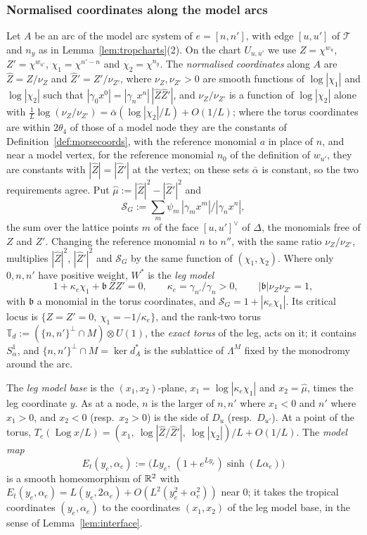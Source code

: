 \subsubsection*{Normalised coordinates along the model arcs}
Let $A$ be an arc of the model arc system of $e=[n,n']$, with edge $[u,u']$ of $\mathcal T$ and $n_y$ as in
Lemma~\ref{lem:tropcharts}(2). On the chart $U_{u,u'}$ we use $Z=\chi^{w_u}$, $Z'=\chi^{w_{u'}}$, $\chi_1=\chi^{n'-n}$ and
$\chi_2=\chi^{n_y}$. The \emph{normalised coordinates} along $A$ are $\hat Z=Z/\nu_Z$ and $\hat Z'=Z'/\nu_{Z'}$, where
$\nu_Z,\nu_{Z'}>0$ are smooth functions of $\log|\chi_1|$ and $\log|\chi_2|$ such that $|\gamma_0x^0|=|\gamma_nx^n|\,|\hat
Z\hat Z'|$, and $\nu_Z/\nu_{Z'}$ is a function of $\log|\chi_2|$ alone with $\frac1L\log(\nu_Z/\nu_{Z'})=\bar\alpha(\log
|\chi_2|/L)+O(1/L)$; where the torus coordinates are within $2\theta_4$ of those of a model node they are the constants of
Definition~\ref{def:morsecoords}, with the reference monomial $a$ in place of $n$, and near a model vertex, for the
reference monomial $n_0$ of the definition of $w_{u'}$, they are constants with $|\hat Z|=|\hat Z'|$ at the vertex; on these sets $\bar\alpha$ is constant, so the two requirements agree.
Put $\hat\mu:=|\hat Z|^2-|\hat Z'|^2$ and
\[
\mathcal S_G:=\sum_m\psi_m\,|\gamma_mx^m|/|\gamma_nx^n|,
\]
the sum over the lattice points $m$ of the face $[u,u']^\vee$ of $\Delta$, the monomials free of $Z$ and $Z'$. Changing
the reference monomial $n$ to $n''$, with the same ratio $\nu_Z/\nu_{Z'}$, multiplies $|\hat Z|^2$, $|\hat Z'|^2$ and
$\mathcal S_G$ by the same function of $(\chi_1,\chi_2)$. Where only $0,n,n'$ have positive weight, $W^*$ is the \emph{leg
model}
\begin{equation}\label{eq:legmodel}
1+\kappa_e\chi_1+\mathfrak b\,ZZ'=0,\qquad\kappa_e=\gamma_{n'}/\gamma_n>0,\qquad|\mathfrak b|\nu_Z\nu_{Z'}=1,
\end{equation}
with $\mathfrak b$ a monomial in the torus coordinates, and $\mathcal S_G=1+|\kappa_e\chi_1|$. Its critical locus is
$\{Z=Z'=0,\ \chi_1=-1/\kappa_e\}$, and the rank-two torus $\mathbb T_d:=(\{n,n'\}^\perp\cap M)\otimes U(1)$, the
\emph{exact torus} of the leg, acts on it; it contains $S^1_\alpha$, and $\{n,n'\}^\perp\cap M=\ker d^*_A$ is the sublattice
of $\Lambda^M$ fixed by the monodromy around the arc.

The \emph{leg model base} is the $(x_1,x_2)$-plane, $x_1=\log|\kappa_e\chi_1|$ and $x_2=\hat\mu$, times the leg
coordinate $y$. As at a node, $n$ is the larger of $n,n'$ where $x_1<0$ and $n'$ where $x_1>0$, and $x_2<0$ (resp.\
$x_2>0$) is the side of $D_u$ (resp.\ $D_{u'}$). At a point of the torus, $T_e(\operatorname{Log}x/L)=(x_1,\
\log|\hat Z/\hat Z'|,\ \log|\chi_2|)/L+O(1/L)$. The \emph{model map}
\[
E_t(y_e,\alpha_e):=\bigl(Ly_e,\ (1+e^{Ly_e})\sinh(L\alpha_e)\bigr)
\]
is a smooth homeomorphism of $\mathbb R^2$ with $E_t(y_e,\alpha_e)=L(y_e,2\alpha_e)+O(L^2(y_e^2+\alpha_e^2))$ near $0$; it
takes the tropical coordinates $(y_e,\alpha_e)$ to the coordinates $(x_1,x_2)$ of the leg model base, in the sense of
Lemma~\ref{lem:interface}.

